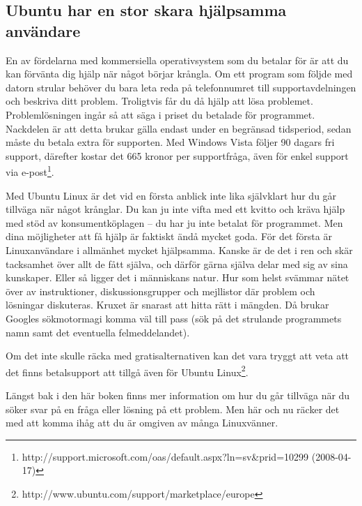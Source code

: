 \documentclass[a4paper,final]{memoir} %
\begin{document}

\subsection{Ubuntu har en stor skara hjälpsamma användare}


En av fördelarna med kommersiella operativsystem som du betalar för är att du kan förvänta dig hjälp när något börjar krångla. Om ett program som följde med datorn strular behöver du bara leta reda på telefonnumret till supportavdelningen och beskriva ditt problem. Troligtvis får du då hjälp att lösa problemet. Problemlösningen ingår så att säga i priset du betalade för programmet. Nackdelen är att detta brukar gälla endast under en begränsad tidsperiod, sedan måste du betala extra för supporten. Med Windows Vista följer 90 dagars fri support, därefter kostar det 665 kronor per supportfråga, även för enkel support via e-post\footnote{http://support.microsoft.com/oas/default.aspx?ln=sv\&prid=10299 (2008-04-17)}.

Med Ubuntu Linux är det vid en första anblick inte lika självklart hur du går tillväga när något krånglar. Du kan ju inte vifta med ett kvitto och kräva hjälp med stöd av konsumentköplagen -- du har ju inte betalat för programmet. Men dina möjligheter att få hjälp är faktiskt ändå mycket goda. För det första är Linuxanvändare i allmänhet mycket hjälpsamma. Kanske är de det i ren och skär tacksamhet över allt de fått själva, och därför gärna själva delar med sig av sina kunskaper. Eller så ligger det i människans natur. Hur som helst svämmar nätet över av instruktioner, diskussionsgrupper och mejllistor där problem och lösningar diskuteras. Kruxet är snarast att hitta rätt i mängden. Då brukar Googles sökmotormagi komma väl till pass (sök  på det strulande programmets namn samt det eventuella felmeddelandet).

Om det inte skulle räcka med gratisalternativen kan det vara tryggt att veta att det finns betalsupport att tillgå även för Ubuntu Linux\footnote{http://www.ubuntu.com/support/marketplace/europe}. 

Längst bak i den här boken finns mer information om hur du går tillväga när du söker svar på en fråga eller lösning på ett problem. Men här och nu räcker det med att komma ihåg att du är omgiven av många Linuxvänner. 

\end{document}
